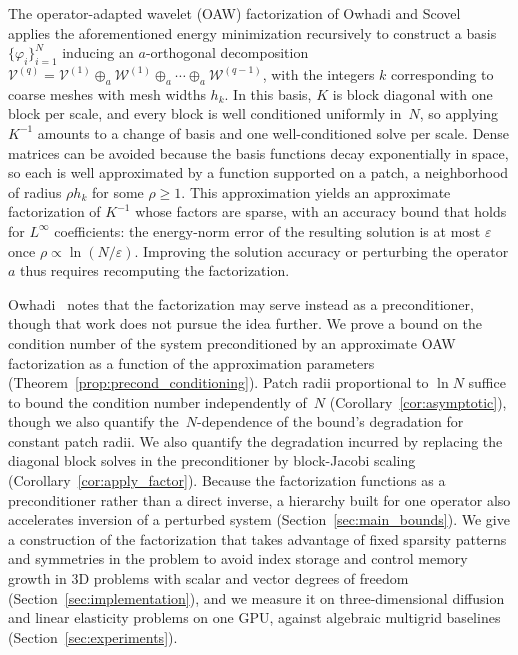 \documentclass[hidelinks]{siamart}
\theoremstyle{nonumberplain}
\numberwithin{theorem}{section}
\begin{document}
The operator-adapted wavelet (OAW) factorization of Owhadi and
Scovel~\cite{owhadi2017,Owhadi_Scovel_2019} applies the aforementioned energy minimization recursively to construct a basis $\{\varphi_i\}_{i=1}^{N}$ inducing an $a$-orthogonal decomposition $\mathcal{V}^{(q)} = \mathcal{V}^{(1)} \oplus_a \mathcal{W}^{(1)}\oplus_a \cdots \oplus_a \mathcal{W}^{(q-1)}$, with the integers $k$ corresponding to coarse meshes with mesh widths $h_k$. In this basis, $K$ is block diagonal
with one block per scale, and every block is well conditioned uniformly
in~$N$, so applying $K^{-1}$ amounts to a change of basis and one well-conditioned solve per scale. Dense matrices can be avoided because the basis functions decay
exponentially in space, so each is well approximated by a function supported on a patch,
a neighborhood of radius $\rho h_k$ for some $\rho \geq 1$.  This approximation yields an approximate
factorization of $K^{-1}$ whose factors are sparse, with an accuracy
bound that holds for $L^\infty$ coefficients: the energy-norm error of
the resulting solution is at most $\varepsilon$ once
$\rho \propto \ln(N/\varepsilon)$.
Improving the solution accuracy or perturbing the operator $a$ thus requires recomputing the factorization.

Owhadi~\cite{owhadi2017} notes that the factorization may serve instead
as a preconditioner, though that work does not pursue the idea further.
We prove a bound on the condition number of the system preconditioned by
an approximate OAW factorization as a function of the approximation
parameters (Theorem~\ref{prop:precond_conditioning}).  Patch radii
proportional to $\ln N$ suffice to bound the condition number
independently of~$N$ (Corollary~\ref{cor:asymptotic}), though we also
quantify the~$N$-dependence of the bound's degradation for constant patch radii.
We also quantify the degradation incurred by replacing the diagonal
block solves in the preconditioner by block-Jacobi scaling
(Corollary~\ref{cor:apply_factor}).  Because the factorization functions
as a preconditioner rather than a direct inverse, a hierarchy built for
one operator also accelerates inversion of a perturbed system
(Section~\ref{sec:main_bounds}).  We give a
construction of the factorization that takes advantage of fixed sparsity
patterns and symmetries in the problem to avoid index storage and
control memory growth in 3D problems with scalar and vector degrees of
freedom (Section~\ref{sec:implementation}), and we measure it on
three-dimensional diffusion and linear elasticity problems on one GPU,
against algebraic multigrid baselines (Section~\ref{sec:experiments}).
\end{document}

